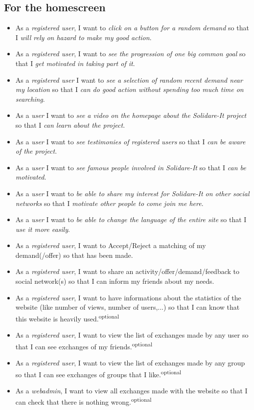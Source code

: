 \subsection{For the homescreen}
\begin{itemize}
    \item As a \textit{registered user}, I want to \textit{click on a button for a random demand} so that I \textit{will rely on hazard to make my good action}.
    \item As a \textit{registered user}, I want to \textit{see the progression of one big common goal} so that I \textit{get motivated in taking part of it}.
    \item As a \emph{registered user} I want to \emph{see a selection of random recent demand near my location} so that I \emph{can do good action without spending too much time on searching}.
    \item As a \emph{user} I want to \emph{see a video on the homepage about the Solidare-It project} so that I \emph{can learn about the project}.
    \item As a \emph{user} I want to \emph{see testimonies of registered users} so that I \emph{can be aware of the project}.
    \item As a \emph{user} I want to \emph{see famous people involved in Solidare-It} so that I \emph{can be motivated}.
    \item As a \textit{user} I want to \textit{be able to share my interest for Solidare-It on other social networks} so that I \textit{motivate other people to come join me here}.
    \item As a \textit{user} I want to \textit{be able to change the language of the entire site} so that I \textit{use it more easily}.
    \item As a \textit{registered user}, I want to Accept/Reject a matching of my demand(/offer) so that has been made.
    \item As a \textit{registered user}, I want to share an activity/offer/demand/feedback to social network(s) so that I can inform my friends about my needs.
    \item As a \textit{registered user}, I want to have informations about the statistics of the website (like number of views, number of users,...) so that I can know that this website is heavily used.\textsuperscript{optional}
    \item As a \textit{registered user}, I want to view the list of exchanges made by any user so that I can see exchanges of my friends.\textsuperscript{optional}
    \item As a \textit{registered user}, I want to view the list of exchanges made by any group so that I can see exchanges of groups that I like.\textsuperscript{optional}
    \item As a \textit{webadmin}, I want to view all exchanges made with the website so that I can check that there is nothing wrong.\textsuperscript{optional}
\end{itemize}

